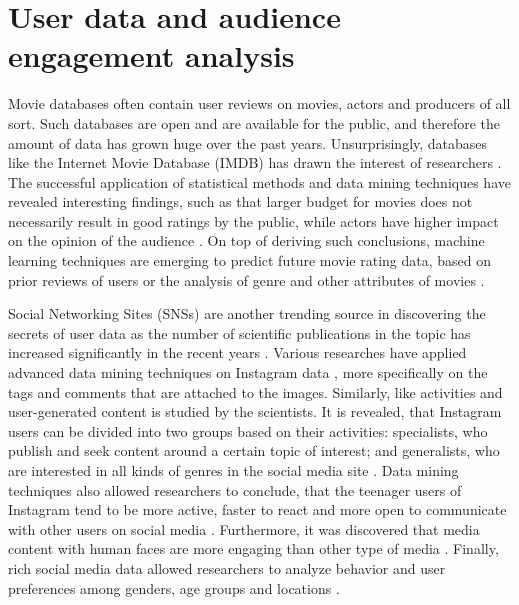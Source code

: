 \documentclass[conference]{IEEEtran}
\begin{document}
\section{User data and audience engagement analysis}
Movie databases often contain user reviews on movies, actors and producers of all sort. Such databases are open and are available for the public, and therefore the amount of data has grown huge over the past years. Unsurprisingly, databases like the Internet Movie Database (IMDB) has drawn the interest of researchers \cite{saraee2004data, kabinsingha2012movie, sumathi2013performance}. The successful application of statistical methods and data mining techniques have revealed interesting findings, such as that larger budget for movies does not necessarily result in good ratings by the public, while actors have higher impact on the opinion of the audience \cite{saraee2004data}. On top of deriving such conclusions, machine learning techniques are emerging to predict future movie rating data, based on prior reviews of users \cite{saraee2004data} or the analysis of genre and other attributes of movies \cite{kabinsingha2012movie}.

Social Networking Sites (SNSs) are another trending source in discovering the secrets of user data as the number of scientific publications in the topic has increased significantly in the recent years \cite{waheed2017investigation}. Various researches have applied advanced data mining techniques on Instagram data \cite{jang2015noreciprocity, bakhshi2014faces, hu2014we, jang2016teensengagemorewithfewerphotos, han2016teensarefrommars}, more specifically on the tags and comments that are attached to the images. Similarly, like activities and user-generated content is studied by the scientists. It is revealed, that Instagram users can be divided into two groups based on their activities: specialists, who publish and seek content around a certain topic of interest; and generalists, who are interested in all kinds of genres in the social media site \cite{jang2015noreciprocity}. Data mining techniques also allowed researchers to conclude, that the teenager users of Instagram tend to be more active, faster to react and more open to communicate with other users on social media \cite{jang2016teensengagemorewithfewerphotos, han2016teensarefrommars}. Furthermore, it was discovered that media content with human faces are more engaging than other type of media \cite{bakhshi2014faces}. Finally, rich social media data allowed researchers to analyze behavior and user preferences among genders, age groups and locations \cite{farseev2015harvestingmultiplesources}.
\end{document}

